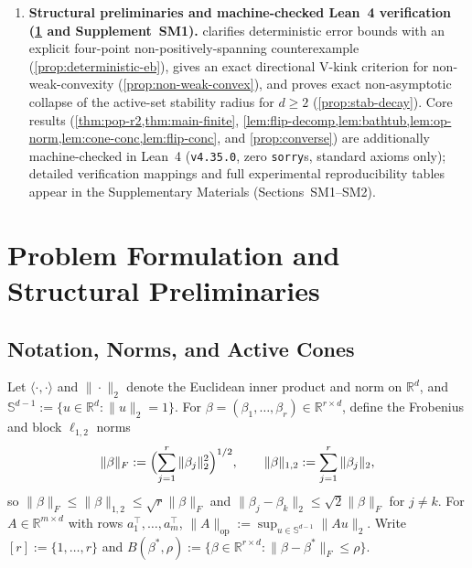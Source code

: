 \documentclass[11pt]{article}
\theoremstyle{plain}
\theoremstyle{remark}
\numberwithin{equation}{section}
\newcommand{\R}{\mathbb{R}}
\newcommand{\Sph}{\mathbb{S}}
\newcommand{\ip}[2]{\langle #1, #2 \rangle}
\newcommand{\norm}[1]{\|#1\|}
\newcommand{\Fnorm}[1]{\|#1\|_F}
\newcommand{\Lonenorm}[1]{\|#1\|_{1,2}}
\newcommand{\opnorm}[1]{\|#1\|_{\mathrm{op}}}
\begin{document}
\begin{enumerate}
  \item \textbf{Structural preliminaries and machine-checked Lean~4 verification (\cref{sec:prelim} and Supplement~SM1).}  clarifies deterministic error bounds with an explicit four-point non-positively-spanning counterexample (\cref{prop:deterministic-eb}), gives an exact directional V-kink criterion for non-weak-convexity (\cref{prop:non-weak-convex}), and proves exact non-asymptotic collapse of the active-set stability radius for $d \ge 2$ (\cref{prop:stab-decay}). Core results (\cref{thm:pop-r2,thm:main-finite}, \cref{lem:flip-decomp,lem:bathtub,lem:op-norm,lem:cone-conc,lem:flip-conc}, and \cref{prop:converse}) are additionally machine-checked in Lean~4 (\texttt{v4.35.0}, zero \texttt{sorry}s, standard axioms only); detailed verification mappings and full experimental reproducibility tables appear in the Supplementary Materials (Sections~SM1--SM2).
\end{enumerate}

\section{Problem Formulation and Structural Preliminaries}
\label{sec:prelim}

\subsection{Notation, Norms, and Active Cones}
\label{sec:notation}

Let $\ip{\cdot}{\cdot}$ and $\norm{\cdot}_2$ denote the Euclidean inner product and norm on $\R^d$, and $\Sph^{d-1} := \{u \in \R^d : \norm{u}_2 = 1\}$. For $\beta = (\beta_1, \dots, \beta_r) \in \R^{r \times d}$, define the Frobenius and block $\ell_{1,2}$ norms
\[
  \Fnorm{\beta} := \Bigl(\sum_{j=1}^r \norm{\beta_j}_2^2\Bigr)^{1/2},
  \qquad
  \Lonenorm{\beta} := \sum_{j=1}^r \norm{\beta_j}_2,
\]
so $\Fnorm{\beta} \le \Lonenorm{\beta} \le \sqrt{r}\Fnorm{\beta}$ and $\norm{\beta_j - \beta_k}_2 \le \sqrt{2}\Fnorm{\beta}$ for $j \ne k$. For $A \in \R^{m \times d}$ with rows $a_1^\top, \dots, a_m^\top$, $\opnorm{A} := \sup_{u \in \Sph^{d-1}} \norm{Au}_2$. Write $[r] := \{1, \dots, r\}$ and $B(\beta^*, \rho) := \{\beta \in \R^{r\times d} : \Fnorm{\beta - \beta^*} \le \rho\}$.
\end{document}
